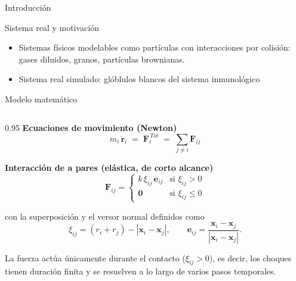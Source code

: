 \documentclass[10pt,aspectratio=169]{beamer}
\newcommand{\vect}[1]{\mathbf{#1}}
\newcommand{\sectiondivider}[1]{%
  \begin{frame}[plain,c]
    \centering
    {\usebeamercolor[fg]{structure}\fontsize{42}{50}\selectfont #1\par}
  \end{frame}%
}
\begin{document}
\sectiondivider{Introducción}

\begin{frame}{Sistema real y motivación}
        \begin{itemize}
            \item Sistemas físicos modelables como partículas con interacciones por colisión: gases diluidos, granos, partículas brownianas.
            \item Sistema real simulado: glóblulos blancos del sistema inmunológico
        \end{itemize}
    \end{frame}

\begin{frame}{Modelo matemático}
    \begin{columns}[T]
        \begin{column}{0.95\textwidth}
            \textbf{Ecuaciones de movimiento (Newton)}
            \[
                m_i\,\ddot{\vect{r}}_i \;=\; \vect{F}_i^{\,Tot} \;=\; \sum_{j \neq i} \vect{F}_{ij}
            \]

            \vspace{0.4em}
            \textbf{Interacción de a pares (elástica, de corto alcance)}
            \[
                \vect{F}_{ij} =
                \begin{cases}
                    k\,\xi_{ij}\,\vect{e}_{ij} & \text{si } \xi_{ij} > 0 \\[2pt]
                    \vect{0} & \text{si } \xi_{ij} \leq 0
                \end{cases}
            \]

            \vspace{0.2em}
            con la superposición y el versor normal definidos como
            \[
                \xi_{ij} = (r_i + r_j) - |\vect{x}_i - \vect{x}_j|,
                \qquad
                \vect{e}_{ij} = \frac{\vect{x}_i - \vect{x}_j}{|\vect{x}_i - \vect{x}_j|}.
            \]

            \vspace{0.3em}
            \footnotesize
            La fuerza actúa únicamente durante el contacto ($\xi_{ij} > 0$),
            es decir, los choques tienen duración finita y se resuelven a lo largo
            de varios pasos temporales.
        \end{column}
    \end{columns}
\end{frame}
\end{document}
